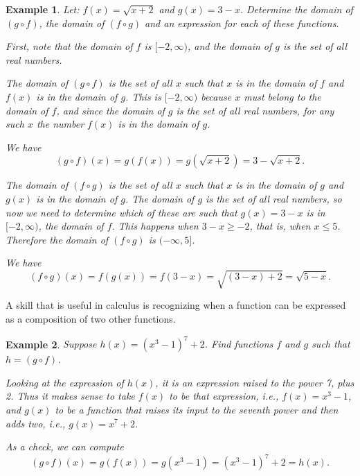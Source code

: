 \documentclass[11pt]{book}               %
\newtheorem{example}{Example}
\begin{document}

\begin{example}
Let: $f(x)=\sqrt{x+2}$ and $g(x) = {3-x}$.  Determine the domain of $(g \circ f)$, 
the domain of $(f \circ g)$ and an expression for each of these functions.
\normalfont

First, note that the domain of $f$ is $[-2,\infty)$, and the domain of $g$ is the set of all real numbers.

The domain of $(g \circ f)$ is the set of all $x$ such that $x$ is in the domain of $f$ and $f(x)$ is in the domain of $g$.  This is $[-2,\infty)$  because $x$ must belong to  the domain of $f$, and since the domain of $g$ is the set of all real numbers, for any such $x$ the number $f(x)$ is in the domain of $g$.

We have $$(g \circ f)(x) = g(f(x)) = g(\sqrt{x+2}) = 3 - \sqrt{x+2}.$$

The domain of $(f \circ g)$ is the set of all $x$ such that $x$ is in the domain of $g$ and $g(x)$ is in the domain of $g$.  The domain of $g$ is the set of all real numbers, so now we need to determine which of these are such that $g(x) = 3-x$ is in $[-2, \infty)$, the domain of $f$.  This happens when $3 - x \geq -2$, that is, when $x \leq 5$.
Therefore the domain of $(f \circ g)$ is $(-\infty,5]$. 

We have $$(f\circ g)(x)=f(g(x)) = f(3-x) = \sqrt{(3-x)+2}=\sqrt{5-x}.$$

\end{example}

A skill that is useful in calculus is recognizing when a function can be expressed as a composition of two other functions.

\begin{example} Suppose $h(x) = (x^3-1)^7+2$.  Find functions $f$ and $g$ such that $h = (g \circ f)$.

\normalfont
Looking at the expression of $h(x)$, it is an expression raised to the power 7, plus 2.  
Thus it makes sense to take $f(x)$ to be that expression, i.e., $f(x) = x^3 - 1$, 
and $g(x)$ to be a function that raises its input to the seventh power and then adds two, i.e., $g(x) = x^7 + 2$.

As a check, we can compute
$$(g \circ f)(x) = g(f(x)) = g(x^3 - 1) = (x^3-1)^7+2 = h(x).$$

\end{example}
\end{document}
